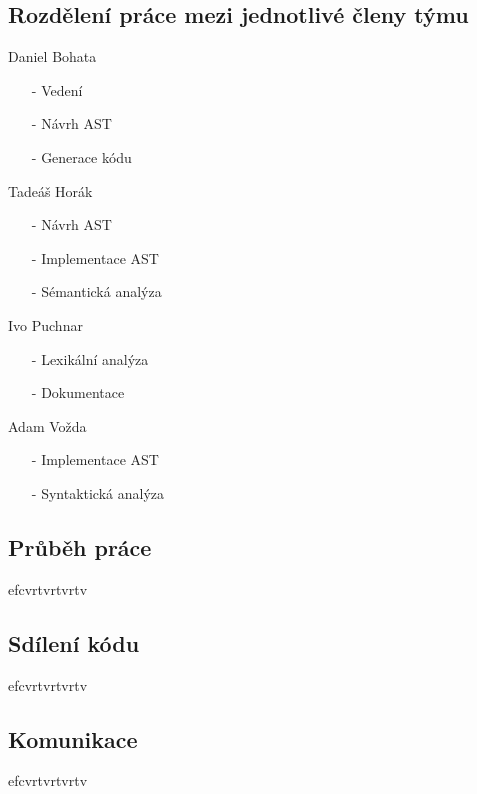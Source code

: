 \documentclass[a4paper, 12pt]{article}
\begin{document}
\subsection{Rozdělení práce mezi jednotlivé členy týmu}
\begin{itemize}
    \begin{minipage}{0.5\linewidth}   
        \item Daniel Bohata
        \begin{itemize}
        \item[-] Vedení
        \item[-] Návrh AST
        \item[-] Generace kódu 
        \end{itemize}
        \item Tadeáš Horák
        \begin{itemize}
        \item[-] Návrh AST
        \item[-] Implementace AST
        \item[-] Sémantická analýza
        \end{itemize}
        \item Ivo Puchnar
        \begin{itemize}
        \item[-] Lexikální analýza
        \item[-] Dokumentace
        \end{itemize}
        \item Adam Vožda
        \begin{itemize}
        \item[-] Implementace AST
        \item[-] Syntaktická analýza
        \end{itemize}
    \end{minipage}
\end{itemize}

\newpage
\subsection{Průběh práce}
efcvrtvrtvrtv
\subsection{Sdílení kódu}
efcvrtvrtvrtv
\subsection{Komunikace}
efcvrtvrtvrtv
\end{document}
